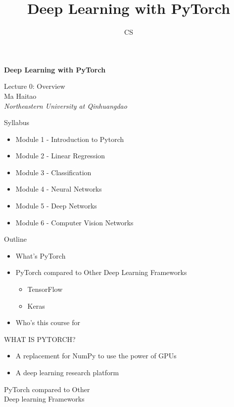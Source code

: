 \documentclass[14 pt]{beamer}
\author[mht]{CS}
\title[Deep Learning with PyTorch]{Deep Learning with PyTorch}
\institute{Northeastern University at Qinhuangdao}
\let\olditem\item
\renewcommand{\item}{\olditem\vspace{4pt}}
\newcommand{\comment}[1]{\textcolor{comment}{\footnotesize{#1}\normalsize}} %
\newcommand{\Comment}[1]{\textcolor{Comment}{\footnotesize{#1}\normalsize}} %
\newcommand{\COMMENT}[1]{\textcolor{COMMENT}{\footnotesize{#1}\normalsize}} %
\begin{document}
\begin{frame}[c]
\begin{center}
	\textcolor{normal text.fg!50!Comment}{\textbf{\Large{Deep Learning with PyTorch}}}
	\vspace{4em}

    \COMMENT{\large{Lecture 0: Overview}} \\
\vspace{4em}
    \Comment{{Ma Haitao}} \\
\comment{\textit{Northeastern University at Qinhuangdao}}\\
\end{center}
\end{frame}

\begin{frame}{Syllabus}
  \begin{itemize}[<+->]
  \item Module 1 - Introduction to Pytorch
  \item Module 2 - Linear Regression
  \item Module 3 - Classification 
  \item Module 4 - Neural Networks
  \item Module 5 - Deep Networks
  \item Module 6 - Computer Vision Networks
  \end{itemize}
\end{frame}

\begin{frame}{Outline}
  \begin{itemize}
\item What's PyTorch
\item PyTorch compared to Other Deep Learning Frameworks
  \begin{itemize}
  \item TensorFlow
  \item Keras
  \end{itemize}
\item Who's this course for
\end{itemize}
\end{frame}

\begin{frame}{WHAT IS PYTORCH?}

\begin{itemize}
\item A replacement for NumPy to use the power of GPUs
\item A deep learning research platform  
\end{itemize}
\end{frame}
\begin{frame}

\begin{center}
\Large{PyTorch compared to Other \\
Deep learning Frameworks}
\end{center}
\end{frame}
\end{document}
